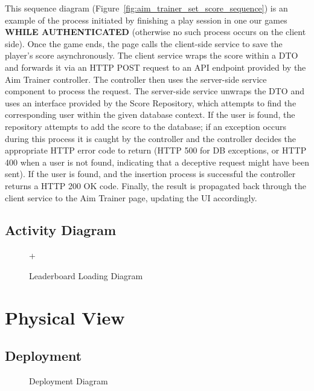 \documentclass[11pt,a4paper]{article}
\newcommand{\inputdiagram}[1]{}
\begin{document}
This sequence diagram (Figure~\ref{fig:aim_trainer_set_score_sequence}) is an
example of the process initiated by finishing a play session in one our games
\textbf{WHILE AUTHENTICATED} (otherwise no such process occurs on the client
side). Once the game ends, the page calls the client-side service to save the
player's score asynchronously. The client service wraps the score within a
DTO and forwards it via an HTTP POST request to an API endpoint provided by
the Aim Trainer controller. The controller then uses the server-side service
component to process the request. The server-side service unwraps the DTO
and uses an interface provided by the Score Repository, which attempts
to find the corresponding user within the given database context.  If the
user is found, the repository attempts to add the score to the database;
if an exception occurs during this process it is caught by the controller
and the controller decides the appropriate HTTP error code to return (HTTP
500 for DB exceptions, or HTTP 400 when a user is not found, indicating
that a deceptive request might have been sent). If the user is found, and
the insertion process is successful the controller returns a HTTP 200 OK
code. Finally, the result is propagated back through the client service to
the Aim Trainer page, updating the UI accordingly.

\subsection{Activity Diagram}
\begin{figure}[H]
    \centering
     \begin{adjustbox}{width=0.92\paperwidth,center}
+        \inputdiagram{leaderboard_activity.tex}
     \end{adjustbox}
    \caption{Leaderboard Loading Diagram}
    \label{fig:leaderboard_activity}
\end{figure}

\section{Physical View}
\subsection{Deployment}
\begin{figure}[H]
    \centering
    \begin{adjustbox}{width=0.92\paperwidth,center}
        \inputdiagram{deployment_diagram.tex}
     \end{adjustbox}
    \caption{Deployment Diagram}
    \label{fig:deployment_diagram}
\end{figure}
\end{document}
